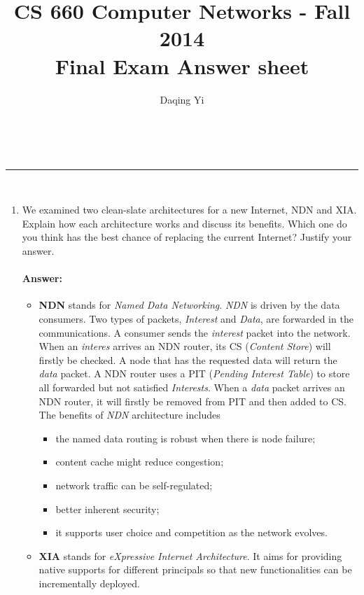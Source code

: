 \documentclass[a4paper,11pt]{article}
\makeatletter
\newcommand{\linia}{\rule{\linewidth}{0.5pt}}
\theoremstyle{mytheor}
\renewcommand{\maketitle}{
\begin{center}
\vspace{2ex}
{\huge \textsc{\@title}}
\vspace{1ex}
\\
\linia\\
\@author \hfill \@date
\vspace{4ex}
\end{center}
}
\makeatother
\begin{document}
\title{CS 660 Computer Networks - Fall 2014 \\ Final Exam Answer sheet}

\author{Daqing Yi}

\date{}

\maketitle

\begin{enumerate}
\item 
We examined two clean-slate architectures for a new Internet, NDN and XIA. 
Explain how each architecture works and discuss its benefits. 
Which one do you think has the best chance of replacing the current Internet?
Justify your answer.
\paragraph{Answer:}
\begin{itemize}
\item
\textbf{NDN} stands for \emph{Named Data Networking}.
\emph{NDN} is driven by the data consumers.
Two types of packets, \emph{Interest} and \emph{Data}, are forwarded in the communications.
A consumer sends the \emph{interest} packet into the network.
When an \emph{interes} arrives an NDN router, its CS (\emph{Content Store}) will firstly be checked.
A node that has the requested data will return the \emph{data} packet.
A NDN router uses a PIT (\emph{Pending Interest Table}) to store all forwarded but not satisfied \emph{Interests}.
When a \emph{data} packet arrives an NDN router, it will firstly be removed from PIT and then added to CS.
The benefits of \emph{NDN} architecture includes
\begin{itemize}
	\item the named data routing is robust when there is node failure;
	\item content cache might reduce congestion;
	\item network traffic can be self-regulated;
	\item better inherent security;
	\item it supports user choice and competition as the network evolves.
\end{itemize}
\item
\textbf{XIA} stands for \emph{eXpressive Internet Architecture}.
It aims for providing native supports for different principals so that new functionalities can be incrementally deployed.

\end{itemize}
\end{enumerate}
\end{document}
